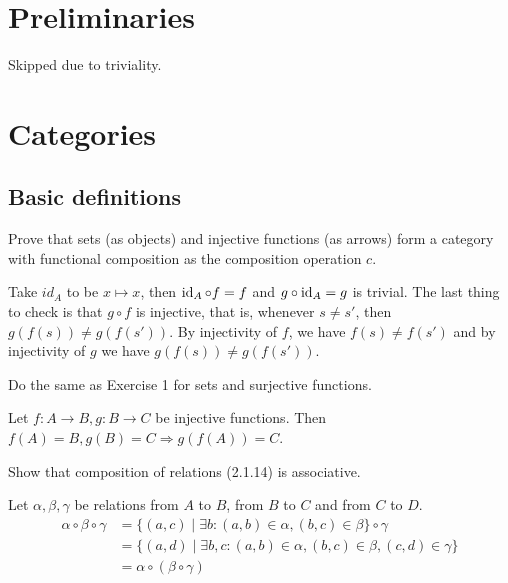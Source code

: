 



\section{Preliminaries}

Skipped due to triviality.

\section{Categories}

\subsection{Basic definitions}

\begin{exercise}
    Prove that sets (as objects) and injective functions (as arrows) form a category with functional composition as the composition operation \(c\).
\end{exercise}
\begin{solution}
    Take \(id_A\) to be \(x \mapsto x\), then \(\operatorname{id}_A \circ f = f\) and \(g \circ \operatorname{id}_A = g\) is trivial. The last thing to check is that \(g \circ f\) is injective, that is, whenever \(s \neq s'\), then \(g(f(s)) \neq g(f(s'))\). By injectivity of \(f\), we have \(f(s) \neq f(s')\) and by injectivity of \(g\) we have \(g(f(s)) \neq g(f(s'))\).
\end{solution}

\begin{exercise}
    Do the same as Exercise 1 for sets and surjective functions.
\end{exercise}
\begin{solution}
    Let \(f : A \to B, g : B \to C\) be injective functions. Then \(f(A) = B, g(B) = C \Rightarrow g(f(A)) = C\).
\end{solution}

\begin{exercise}
    Show that composition of relations (2.1.14) is associative.
\end{exercise}
\begin{solution}
    Let \(\alpha, \beta, \gamma\) be relations from \(A\) to \(B\), from \(B\) to \(C\) and from \(C\) to \(D\).
    \begin{align*}
        \alpha \circ \beta \circ \gamma
         & = \{(a, c) \mid \exists b : (a, b) \in \alpha, (b, c) \in \beta\} \circ \gamma          \\
         & = \{(a, d) \mid \exists b, c : (a, b) \in \alpha, (b, c) \in \beta, (c, d) \in \gamma\} \\
         & = \alpha \circ (\beta \circ \gamma)
    \end{align*}
\end{solution}

